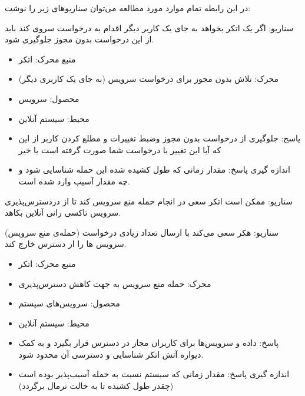در این رابطه تمام موارد مورد مطالعه می‌توان سناریو‌های زیر را نوشت:

سناریو: اگر یک اتکر بخواهد به جای یک کاربر دیگر اقدام به درخواست سروی کند باید از این درخواست بدون مجوز جلوگیری شود.
\begin{itemize}
\item
منبع محرک: اتکر
\item
محرک: تلاش بدون مجوز برای درخواست سرویس (به جای یک کاربری دیگر) 
\item
محصول: سرویس
\item
محیط: سیستم آنلاین
\item
پاسخ: جلوگیری از درخواست بدون مجوز وضبط تغییرات و مطلع کردن کاربر از این که آیا این تغییر با درخواست شما صورت گرفته است یا خیر
\item
اندازه گیری پاسخ: مقدار زمانی که طول کشیده شده این حمله شناسایی  شود و چه مقدار آسیب وارد شده است. 
\end{itemize}

سناریو:
ممکن است اتکر سعی در انجام حمله منع سرویس کند تا از دردسترس‌پذیری سرویس تاکسی رانی آنلاین بکاهد. 

سناریو: هکر سعی می‌کند با ارسال تعداد زیادی درخواست (حمله‌ی منع سرویس) سرویس ها را از دسترس خارج کند.
\begin{itemize}
\item
منبع محرک: اتکر 
\item
محرک: حمله منع سرویس به جهت کاهش دسترس‌پذیری
\item
محصول:  سرویس‌های سیستم 
\item
محیط: سیستم آنلاین
\item
پاسخ:  داده و سرویس‌ها برای کاربران مجاز در دسترس قرار بگیرد و به کمک دیواره آتش اتکر شناسایی و دسترسی آن محدود شود.
\item
اندازه گیری پاسخ: مقدار زمانی که سیستم نسبت به حمله آسیب‌پذیر بوده است (چقدر طول کشیده تا به حالت نرمال برگردد)
\end{itemize}